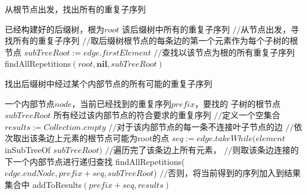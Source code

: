 \begin{algorithm}
  \caption{从根节点出发，找出所有的重复子序列\label{suffixtree:algo:fromroot}}
  \begin{algorithmic}[1]
    \Require 已经构建好的后缀树，根为$root$
    \Ensure 该后缀树中所有的重复子序列
    \State $//$从节点出发，寻找所有的重复子序列
    \State $//$取后缀树根节点的每条边的第一个元素作为每个子树的根节点
    \State $subTreeRoot := edge.firstElement$
    \State $//$查找以该节点为根的所有重复子序列
    \State findAllRepetitions$(root, \mathbf{nil}, subTreeRoot)$
    \EndFor
  \end{algorithmic}
\end{algorithm}

\begin{algorithm}
  \caption{找出后缀树中经过某个内部节点的所有可能的重复子序列}
  \label{suffixtree:algo:findrep}
  \begin{algorithmic}[1]
    \Require 一个内部节点$node$，当前已经找到的重复序列$prefix$，要找的
    子树的根节点$subTreeRoot$
    \Ensure 所有经过该内部节点的符合要求的重复序列
    \State $//$定义一个空集合
    \State $results := Collection.empty$
    \State $//$对于该内部节点的每一条不连接叶子节点的边
    \State $//$依次取出该条边上元素的根节点可能为root的点
    \State $seq := edge.takeWhile(element$ inSubTreeOf $subTreeRoot)$\label{suffixtree:code:equals}
    \State $//$遍历完了该条边上所有元素，
    \State $//$则取该条边连接的下一个内部节点进行递归查找
    \State findAllRepetitions($edge.endNode, prefix + seq, subTreeRoot$)
    \Else
    \State $//$否则，将当前得到的序列加入到结果集合中
    \State addToResults$(prefix + seq, results)$\label{suffixtree:code:add}
    \EndIf
    \EndFor
    \State {}
    \EndFunction
    \State
  \end{algorithmic}
\end{algorithm}

